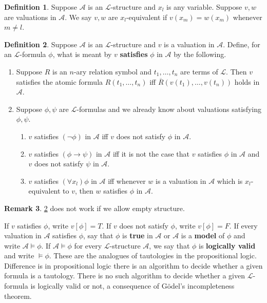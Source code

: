 \documentclass{article}
\newcommand{\A}{\mathcal{A}}
\renewcommand{\L}{\mathcal{L}}
\newcommand{\rb}[1]{\left( #1 \right)}
\renewcommand{\sb}[1]{\left[ #1 \right]}
\newcommand{\notb}[1]{\rb{\neg #1}}
\newcommand{\impb}[2]{\rb{#1 \rightarrow #2}}
\newcommand{\fab}[1]{\rb{\forall #1}}
\theoremstyle{definition}\newtheorem{definition}{Definition}[subsection]
\theoremstyle{definition}\newtheorem{remark}[definition]{Remark}
\theoremstyle{definition}\newtheorem*{example}{Example}
\theoremstyle{definition}\newtheorem*{note}{Note}
\begin{document}
\begin{definition}
Suppose $ \A $ is an $ \L $-structure and $ x_l $ is any variable. Suppose $ v, w $ are valuations in $ \A $. We say $ v, w $ are $ x_l $-equivalent if $ v\rb{x_m} = w\rb{x_m} $ whenever $ m \ne l $.
\end{definition}

\begin{definition}
\label{def:2.2.9}
Suppose $ \A $ is an $ \L $-structure and $ v $ is a valuation in $ \A $. Define, for an $ \L $-formula $ \phi $, what is meant by $ v $ \textbf{satisfies} $ \phi $ in $ \A $ by the following.
\begin{enumerate}
\item Suppose $ R $ is an $ n $-ary relation symbol and $ t_1, \dots, t_n $ are terms of $ \L $. Then $ v $ satisfies the atomic formula $ R\rb{t_1, \dots, t_n} $ iff $ \overline{R}\rb{v\rb{t_1}, \dots, v\rb{t_n}} $ holds in $ \A $.
\item Suppose $ \phi, \psi $ are $ \L $-formulas and we already know about valuations satisfying $ \phi, \psi $.
\begin{enumerate}
\item $ v $ satisfies $ \notb{\phi} $ in $ \A $ iff $ v $ does not satisfy $ \phi $ in $ \A $.
\item $ v $ satisfies $ \impb{\phi}{\psi} $ in $ \A $ iff it is not the case that $ v $ satisfies $ \phi $ in $ \A $ and $ v $ does not satisfy $ \psi $ in $ \A $.
\item $ v $ satisfies $ \fab{x_l}\phi $ in $ \A $ iff whenever $ w $ is a valuation in $ \A $ which is $ x_l $-equivalent to $ v $, then $ w $ satisfies $ \phi $ in $ \A $.
\end{enumerate}
\end{enumerate}
\end{definition}


\begin{remark}
\ref{def:2.2.9} does not work if we allow empty structure.
\end{remark}

If $ v $ satisfies $ \phi $, write $ v\sb{\phi} = T $. If $ v $ does not satisfy $ \phi $, write $ v\sb{\phi} = F $. If every valuation in $ \A $ satisfies $ \phi $, say that $ \phi $ is \textbf{true} in $ \A $ or $ \A $ is a \textbf{model} of $ \phi $ and write $ \A \vDash \phi $. If $ \A \vDash \phi $ for every $ \L $-structure $ \A $, we say that $ \phi $ is \textbf{logically valid} and write $ \vDash \phi $. These are the analogues of tautologies in the propositional logic. Difference is in propositional logic there is an algorithm to decide whether a given formula is a tautology. There is no such algorithm to decide whether a given $ \L $-formula is logically valid or not, a consequence of Gödel's incompleteness theorem.
\end{document}

